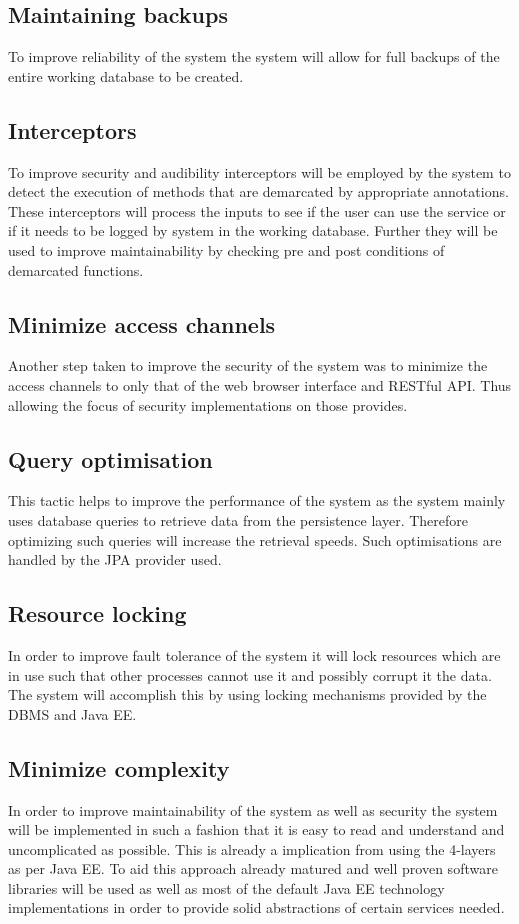 \documentclass[12pt]{article}
\begin{document}
\subsection{Maintaining backups}
To improve reliability of the system the system will allow for full backups of the entire working database to be created.

\subsection{Interceptors}
To improve security and audibility interceptors will be employed by the system to detect the execution of methods that are demarcated by appropriate annotations. These interceptors will process the inputs to see if the user can use the service or if it needs to be logged by system in the working database. Further they will be used to improve maintainability by checking pre and post conditions of demarcated functions.

\subsection{Minimize access channels}
Another step taken to improve the security of the system was to minimize the access channels to only that of the web browser interface and RESTful API. Thus allowing the focus of security implementations on those provides.

\subsection{Query optimisation}
This tactic helps to improve the performance of the system as the system mainly uses database queries to retrieve data from the persistence layer. Therefore optimizing such queries will increase the retrieval speeds. Such optimisations are handled by the JPA provider used.

\subsection{Resource locking}
In order to improve fault tolerance of the system it will lock resources which are in use such that other processes cannot use it and possibly corrupt it the data. The system will accomplish this by using locking mechanisms provided by the DBMS and Java EE.

\subsection{Minimize complexity}
In order to improve maintainability of the system as well as security the system will be implemented in such a fashion that it is easy to read and understand and uncomplicated as possible. This is already a implication from using the 4-layers as per Java EE. To aid this approach already matured and well proven software libraries will be used as well as most of the default Java EE technology implementations in order to provide solid abstractions of certain services needed.
\end{document}
